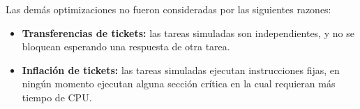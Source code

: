 \vspace{2mm}
Las dem\'as optimizaciones no fueron consideradas por las siguientes razones:

\begin{itemize}

\item \textbf{Transferencias de tickets:} las tareas simuladas son independientes, y no se bloquean esperando una respuesta de otra tarea.

\item \textbf{Inflaci\'on de tickets:} las tareas simuladas ejecutan instrucciones fijas, en ning\'un momento ejecutan alguna secci\'on cr\'itica en la cual requieran m\'as tiempo de CPU. 

\end{itemize}

